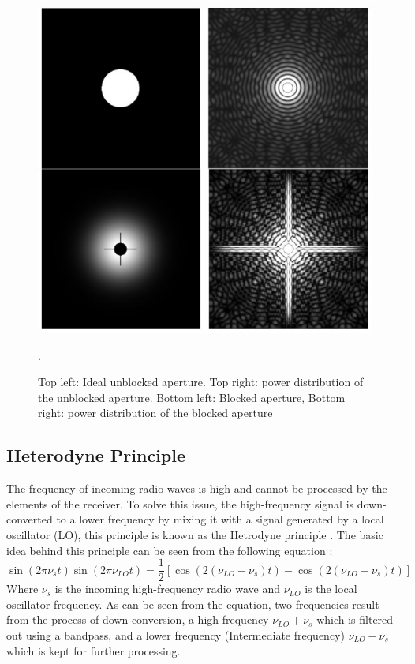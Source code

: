 \documentclass[12pt]{article}
\begin{document}
        \begin{figure}[H]
            \centering
            \includegraphics[scale=0.5]{fig/blocking.jpg}
            \caption{Top left: Ideal unblocked aperture. Top right: power distribution of the unblocked aperture. Bottom left: Blocked aperture, Bottom right: power distribution of the blocked aperture}. 
            \label{fig2.3}
        \end{figure} 
    \subsection{Heterodyne Principle}
    The frequency of incoming radio waves is high and cannot be processed by the elements of the receiver. To solve this issue, the high-frequency signal is down-converted to a lower frequency by mixing it with a signal generated by a local oscillator (LO), this principle is known as the Hetrodyne principle \cite{klein}. The basic idea behind this principle can be seen from the following equation \cite{klein}:
    \begin{equation}
    \sin(2 \pi \nu_s t) \sin (2 \pi \nu_{LO} t) = \frac{1}{2} [\cos (2(\nu_{LO} - \nu_{s})t)-\cos (2(\nu_{LO} + \nu_{s})t)]     
    \end{equation}
    Where $\nu_{s}$ is the incoming high-frequency radio wave and $\nu_{LO}$ is the local oscillator frequency. As can be seen from the equation, two frequencies result from the process of down conversion, a high frequency $\nu_{LO} + \nu_{s}$ which is filtered out using a bandpass, and a lower frequency (Intermediate frequency) $\nu_{LO}-  \nu_{s}$ which is kept for further processing. 
    
\end{document}
